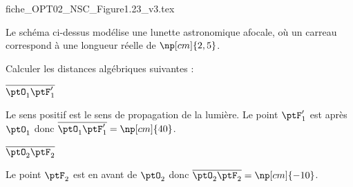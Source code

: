 \hauteurLargeurCadreReponse		{8mm}{5cm}
\typeEntrainement				{} %
\initialisationEntrainement

\begin{center}
{fiche_OPT02_NSC_Figure1.23_v3.tex}
\end{center}

Le schéma ci-dessus modélise une lunette astronomique afocale, où un carreau correspond à une longueur réelle de $\np[cm]{2,5}$. 


Calculer les distances algébriques suivantes :

\debutEntrainement


\begin{enonce}
$\overline{\ptO_1\ptF'_1}$
\end{enonce}


\begin{corrige}
Le sens positif est le sens de propagation de la lumière. Le point $\ptF'_1$ est après $\ptO_1$ donc 
$\overline{\ptO_1\ptF'_1}=\np[cm]{40}$.
\end{corrige}




\begin{enonce}
$\overline{\ptO_2\ptF_2}$
\end{enonce}


\begin{corrige}
Le point $\ptF_2$ est en avant de $\ptO_2$ 
donc $\overline{\ptO_2\ptF_2}=\np[cm]{-10}$.
\end{corrige}

